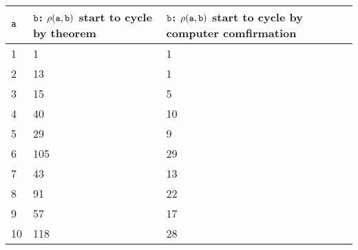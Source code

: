 \begin{tabular}{lll}
 $\mathtt{a}$  & $\mathtt{b}$: $\rho(\mathtt{a},\mathtt{b})$ start to cycle by theorem & $\mathtt{b}$: $\rho(\mathtt{a},\mathtt{b})$ start to cycle by computer comfirmation \\
\hline
 1  & 1                                     & 1                                                   \\
 2  & 13                                    & 1                                                   \\
 3  & 15                                    & 5                                                   \\
 4  & 40                                    & 10                                                  \\
 5  & 29                                    & 9                                                   \\
 6  & 105                                   & 29                                                  \\
 7  & 43                                    & 13                                                  \\
 8  & 91                                    & 22                                                  \\
 9  & 57                                    & 17                                                  \\
 10 & 118                                   & 28                                                  \\
\hline
\end{tabular}
